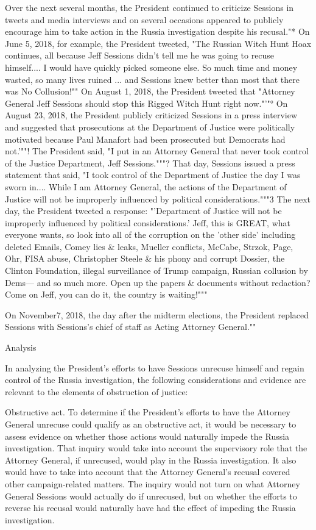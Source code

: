 Over the next several months, the President continued to criticize Sessions in tweets and media interviews and on several occasions appeared to publicly encourage him to take action in the Russia investigation despite his recusal."*
On June 5, 2018, for example, the President tweeted, "The Russian Witch Hunt Hoax continues, all because Jeff Sessions didn't tell me he was going to recuse himself.... I would have quickly picked someone else.
So much time and money wasted, so many lives ruined ... and Sessions knew better than most that there was No Collusion!""
On August 1, 2018, the President tweeted that "Attorney General Jeff Sessions should stop this Rigged Witch Hunt right now."'"°
On August 23, 2018, the President publicly criticized Sessions in a press interview and suggested that prosecutions at the Department of Justice were politically motivated because Paul Manafort had been prosecuted but Democrats had not.'""! The President said, "I put in an Attorney General that never took control of the Justice Department, Jeff Sessions."""?
That day, Sessions issued a press statement that said, "I took control of the Department of Justice the day I was sworn in....
While I am Attorney General, the actions of the Department of Justice will not be improperly influenced by political considerations."""3
The next day, the President tweeted a response: "'Department of Justice will not be improperly influenced by political considerations.'
Jeff, this is GREAT, what everyone wants, so look into all of the corruption on the 'other side' including deleted Emails, Comey lies \& leaks, Mueller conflicts, McCabe, Strzok, Page, Ohr, FISA abuse, Christopher Steele \& his phony and corrupt Dossier, the Clinton Foundation, illegal surveillance of Trump campaign, Russian collusion by Dems— and so much more.
Open up the papers \& documents without redaction? Come on Jeff, you can do it, the country is waiting!"""

On November7, 2018, the day after the midterm elections, the President replaced Sessions with Sessions's chief of staff as Acting Attorney General.""

Analysis

In analyzing the President's efforts to have Sessions unrecuse himself and regain control of the Russia investigation, the following considerations and evidence are relevant to the elements of obstruction of justice:

Obstructive act.
To determine if the President's efforts to have the Attorney General unrecuse could qualify as an obstructive act, it would be necessary to assess evidence on whether those actions would naturally impede the Russia investigation.
That inquiry would take into account the supervisory role that the Attorney General, if unrecused, would play in the Russia investigation.
It also would have to take into account that the Attorney General's recusal covered other campaign-related matters.
The inquiry would not turn on what Attorney General Sessions would actually do if unrecused, but on whether the efforts to reverse his recusal would naturally have had the effect of impeding the Russia investigation.

